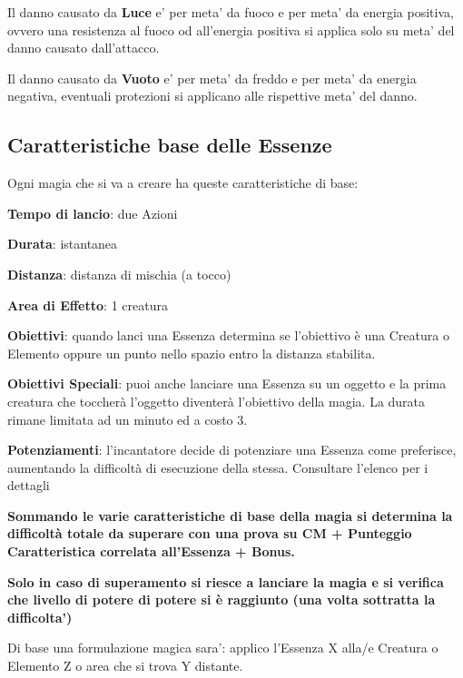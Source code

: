 \documentclass[a4paper,11pt,twoside,openany]{book}
\begin{document}
Il danno causato da \textbf{Luce} e' per meta' da fuoco e per meta' da energia positiva, ovvero una resistenza al fuoco od all'energia positiva si applica solo su meta' del danno causato dall'attacco.

Il danno causato da \textbf{Vuoto} e' per meta' da freddo e per meta' da energia negativa, eventuali protezioni si applicano alle rispettive meta' del danno.

\subsection{Caratteristiche base delle Essenze}

\label{caratteristiche-base-delle-essenze}

Ogni magia che si va a creare ha queste caratteristiche di base:

\smallskip

\textbf{Tempo di lancio}: due Azioni

\textbf{Durata}: istantanea

\textbf{Distanza}: distanza di mischia (a tocco)

\textbf{Area di Effetto}: 1 creatura 

\textbf{Obiettivi}: quando lanci una Essenza determina se l'obiettivo è una Creatura o Elemento oppure un punto nello spazio entro la distanza stabilita.

\textbf{Obiettivi Speciali}: puoi anche lanciare una Essenza su un oggetto e la prima creatura che toccherà l'oggetto diventerà l'obiettivo della magia. La durata rimane limitata ad un minuto ed a costo 3.

\textbf{Potenziamenti}: l'incantatore decide di potenziare una Essenza come preferisce, aumentando la difficoltà di esecuzione della stessa. Consultare l'elenco per i dettagli

\textbf{Sommando le varie caratteristiche di base della magia si determina la difficoltà totale da superare con una prova su CM + Punteggio Caratteristica correlata all'Essenza + Bonus.}

\textbf{Solo in caso di superamento si riesce a lanciare la magia e si verifica che livello di potere di potere si è raggiunto (una volta sottratta la difficolta')}

Di base una formulazione magica sara': applico l'Essenza X alla/e Creatura o Elemento Z o area che si trova Y distante.
\end{document}
